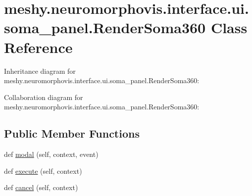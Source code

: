 \hypertarget{classmeshy_1_1neuromorphovis_1_1interface_1_1ui_1_1soma__panel_1_1RenderSoma360}{}\section{meshy.\+neuromorphovis.\+interface.\+ui.\+soma\+\_\+panel.\+Render\+Soma360 Class Reference}
\label{classmeshy_1_1neuromorphovis_1_1interface_1_1ui_1_1soma__panel_1_1RenderSoma360}


Inheritance diagram for meshy.\+neuromorphovis.\+interface.\+ui.\+soma\+\_\+panel.\+Render\+Soma360\+:


Collaboration diagram for meshy.\+neuromorphovis.\+interface.\+ui.\+soma\+\_\+panel.\+Render\+Soma360\+:
\subsection*{Public Member Functions}
\begin{DoxyCompactItemize}
\item 
def \hyperlink{classmeshy_1_1neuromorphovis_1_1interface_1_1ui_1_1soma__panel_1_1RenderSoma360_a461712905f9fc4243a178944be5ed3ec}{modal} (self, context, event)
\item 
def \hyperlink{classmeshy_1_1neuromorphovis_1_1interface_1_1ui_1_1soma__panel_1_1RenderSoma360_a9ecf489964dfbefa7ee3e2a727714506}{execute} (self, context)
\item 
def \hyperlink{classmeshy_1_1neuromorphovis_1_1interface_1_1ui_1_1soma__panel_1_1RenderSoma360_a169e4253dfd8ec743eb0f08c15a5e3f0}{cancel} (self, context)
\end{DoxyCompactItemize}
